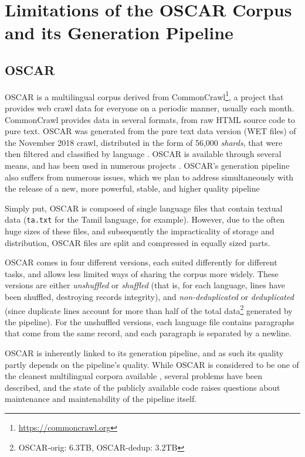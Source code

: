 \section{Limitations of the OSCAR Corpus and its Generation Pipeline}

\subsection{OSCAR}

OSCAR is a multilingual corpus derived from CommonCrawl\footnote{\url{https://commoncrawl.org}}, a project that provides web crawl data for everyone on a periodic manner, usually each month. CommonCrawl provides data in several formats, from raw HTML source code to pure text. OSCAR was generated from the pure text data version (WET files) of the November 2018 crawl, distributed in the form of 56,000 \emph{shards}, that were then filtered and classified by language \citep{ortiz-suarez-etal-2019-asynchronous,ortiz-suarez-etal-2020-monolingual}. OSCAR is available through several means, and has been used in numerous projects \citep{ortiz-suarez-etal-2019-asynchronous}. OSCAR's generation pipeline also suffers from numerous issues, which we plan to address simultaneously with the release of a new, more powerful, stable, and higher quality pipeline

Simply put, OSCAR is composed of single language files that contain textual data (\texttt{ta.txt} for the Tamil language, for example). However, due to the often huge sizes of these files, and subsequently the impracticality of storage and distribution, OSCAR files are split and compressed in equally sized parts.

OSCAR comes in four different versions, each suited differently for different tasks, and allows less limited ways of sharing the corpus more widely. These versions are either \emph{unshuffled} or \emph{shuffled} (that is, for each language, lines have been shuffled, destroying records integrity), and \emph{non-deduplicated} or \emph{deduplicated} (since duplicate lines account for more than half of the total data\footnote{OSCAR-orig: 6.3TB, OSCAR-dedup: 3.2TB} generated by the pipeline).
For the unshuffled versions, each language file contains paragraphs that come from the same record, and each paragraph is separated by a newline.

OSCAR is inherently linked to its generation pipeline, and as such its quality partly depends on the pipeline's quality. While OSCAR is considered to be one of the cleanest multilingual corpora available \citep{caswell-etal-2020-language,caswell_quality_2021}, several problems have been described, and the state of the publicly available code raises questions about maintenance and maintenability of the pipeline itself.

